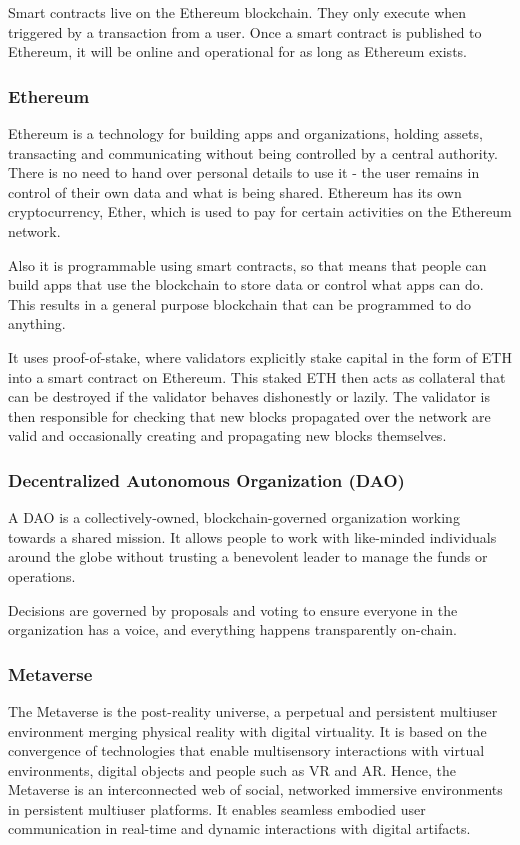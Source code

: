 \documentclass[MSE,Master,english]{twbook}%
\begin{document}
Smart contracts live on the Ethereum blockchain. They only execute when triggered by a transaction from a user. Once a smart contract is published to Ethereum, it will be online and operational for as long as Ethereum exists.

\subsubsection{Ethereum}
Ethereum is a technology for building apps and organizations, holding assets, transacting and communicating without being controlled by a central authority. There is no need to hand over personal details to use it - the user remains in control of their own data and what is being shared. Ethereum has its own cryptocurrency, Ether, which is used to pay for certain activities on the Ethereum network.

Also it is programmable using smart contracts, so that means that people can build apps that use the blockchain to store data or control what apps can do. This results in a general purpose blockchain that can be programmed to do anything.

It uses proof-of-stake, where validators explicitly stake capital in the form of ETH into a smart contract on Ethereum. This staked ETH then acts as collateral that can be destroyed if the validator behaves dishonestly or lazily. The validator is then responsible for checking that new blocks propagated over the network are valid and occasionally creating and propagating new blocks themselves.

\subsubsection{Decentralized Autonomous Organization (DAO)}
A DAO is a collectively-owned, blockchain-governed organization working towards a shared mission. It allows people to work with like-minded individuals around the globe without trusting a benevolent leader to manage the funds or operations.

Decisions are governed by proposals and voting to ensure everyone in the organization has a voice, and everything happens transparently on-chain.

\subsubsection{Metaverse}
The Metaverse is the post-reality universe, a perpetual and persistent multiuser environment merging physical reality with digital virtuality. It is based on the convergence of technologies that enable multisensory interactions with virtual environments, digital objects and people such as VR and AR. Hence, the Metaverse is an interconnected web of social, networked immersive environments in persistent multiuser platforms. It enables seamless embodied user communication in real-time and dynamic interactions with digital artifacts.
\end{document}
